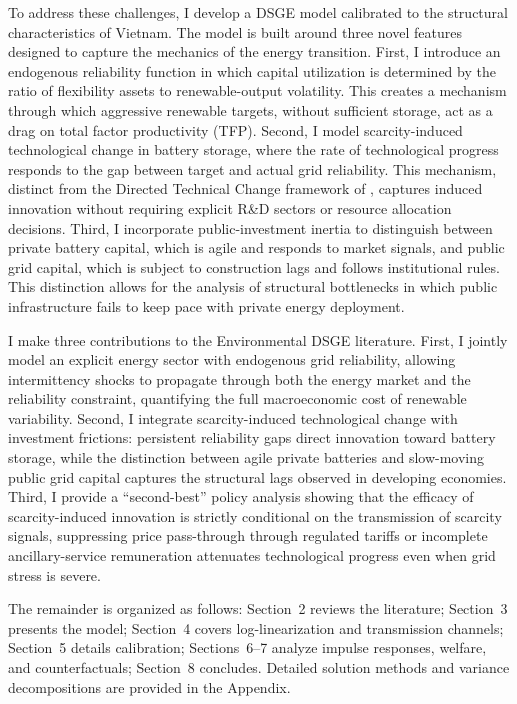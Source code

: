 	To address these challenges, I develop a DSGE model calibrated to the structural characteristics of Vietnam. The model is built around three novel features designed to capture the mechanics of the energy transition. First, I introduce an endogenous reliability function in which capital utilization is determined by the ratio of flexibility assets to renewable-output volatility. This creates a mechanism through which aggressive renewable targets, without sufficient storage, act as a drag on total factor productivity (TFP). Second, I model scarcity-induced technological change in battery storage, where the rate of technological progress responds to the gap between target and actual grid reliability. This mechanism, distinct from the Directed Technical Change framework of \citet{acemoglu2002}, captures induced innovation without requiring explicit R\&D sectors or resource allocation decisions. Third, I incorporate public-investment inertia to distinguish between private battery capital, which is agile and responds to market signals, and public grid capital, which is subject to construction lags and follows institutional rules. This distinction allows for the analysis of structural bottlenecks in which public infrastructure fails to keep pace with private energy deployment.
	
	I make three contributions to the Environmental DSGE literature. First, I jointly model an explicit energy sector with endogenous grid reliability, allowing intermittency shocks to propagate through both the energy market and the reliability constraint, quantifying the full macroeconomic cost of renewable variability. Second, I integrate scarcity-induced technological change with investment frictions: persistent reliability gaps direct innovation toward battery storage, while the distinction between agile private batteries and slow-moving public grid capital captures the structural lags observed in developing economies. Third, I provide a ``second-best'' policy analysis showing that the efficacy of scarcity-induced innovation is strictly conditional on the transmission of scarcity signals, suppressing price pass-through through regulated tariffs or incomplete ancillary-service remuneration attenuates technological progress even when grid stress is severe.
	
	The remainder is organized as follows: Section~2 reviews the literature; Section~3 presents the model; Section~4 covers log-linearization and transmission channels; Section~5 details calibration; Sections~6--7 analyze impulse responses, welfare, and counterfactuals; Section~8 concludes. Detailed solution methods and variance decompositions are provided in the Appendix.
	
